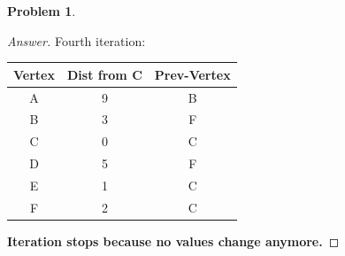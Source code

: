 \documentclass[11pt]{article}
\theoremstyle{definition}
\theoremstyle{definition}
\newtheorem{required}{Problem}
\theoremstyle{definition}
\begin{document}
\begin{required}
\begin{proof}[Answer]
Fourth iteration:
\begin{center}
\begin{tabular}[c]{|c|c|c|} 
	Vertex &Dist from C &Prev-Vertex \\\hline
	A &9 & B\\
	B & 3 &F\\
	C &0& C\\
	D &5  & F\\
	E & 1& C\\
	F &2 & C\\
\end{tabular}
\end{center}	
\textbf{Iteration stops because no values change anymore.}
\end{proof}


\end{required}
\end{document}
